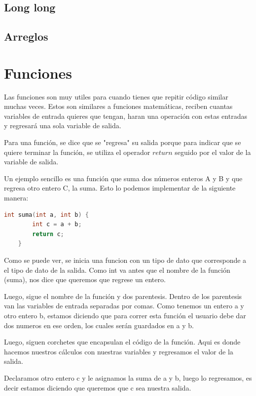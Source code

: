 \documentclass{article}
\begin{document}
\subsection{Long long}

\subsection{Arreglos}

\section{Funciones}

Las funciones son muy utiles para cuando tienes que repitir código similar muchas veces. Estos son similares a funciones matemáticas, reciben cuantas variables de entrada quieres que tengan, haran una operación con estas entradas y regresará una sola variable de salida.

Para una función, se dice que se "regresa" su salida porque para indicar que se quiere terminar la función, se utiliza el operador $return$ seguido por el valor de la variable de salida.

Un ejemplo sencillo es una función que suma dos números enteros A y B y que regresa otro entero C, la suma. Esto lo podemos implementar de la siguiente manera:

\begin{lstlisting}[language=C++, caption=Función de suma]
    int suma(int a, int b) {
        int c = a + b;
        return c;
    }
\end{lstlisting}

Como se puede ver, se inicia una funcion con un tipo de dato que corresponde a el tipo de dato de la salida. Como int va antes que el nombre de la función (suma), nos dice que queremos que regrese un entero.

Luego, sigue el nombre de la función y dos parentesis. Dentro de los parentesis van las variables de entrada separadas por comas. Como tenemos un entero a y otro entero b, estamos diciendo que para correr esta función el usuario debe dar dos numeros en ese orden, los cuales serán guardados en a y b.

Luego, siguen corchetes que encapsulan el código de la función. Aqui es donde hacemos nuestros cálculos con nuestras variables y regresamos el valor de la salida.

Declaramos otro entero c y le asignamos la suma de a y b, luego lo regresamos, es decir estamos diciendo que queremos que c sea nuestra salida.
\end{document}
